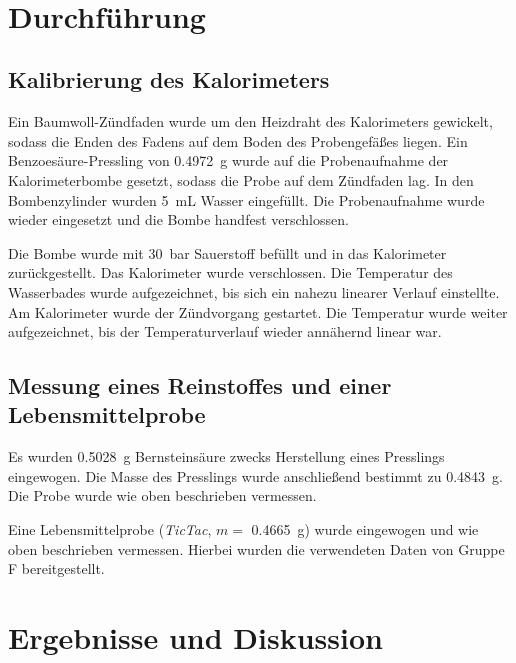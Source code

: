 \hfill
{} \\

\section{Durchführung}
\subsection{Kalibrierung des Kalorimeters}
Ein Baumwoll-Zündfaden wurde um den Heizdraht des Kalorimeters gewickelt, sodass die Enden des Fadens auf dem Boden des Probengefäßes liegen.
Ein Benzoesäure-Pressling von \qty{0.4972}{\gram} wurde auf die Probenaufnahme der Kalorimeterbombe gesetzt, sodass die Probe auf dem Zündfaden lag.
In den Bombenzylinder wurden \qty{5}{\milli\liter} Wasser eingefüllt.
Die Probenaufnahme wurde wieder eingesetzt und die Bombe handfest verschlossen.

Die Bombe wurde mit \qty{30}{\bar} Sauerstoff befüllt und in das Kalorimeter zurückgestellt.
Das Kalorimeter wurde verschlossen.
Die Temperatur des Wasserbades wurde aufgezeichnet, bis sich ein nahezu linearer Verlauf einstellte.
Am Kalorimeter wurde der Zündvorgang gestartet.
Die Temperatur wurde weiter aufgezeichnet, bis der Temperaturverlauf wieder annähernd linear war.

\subsection{Messung eines Reinstoffes und einer Lebensmittelprobe}
Es wurden \qty{0.5028}{\gram} Bernsteinsäure zwecks Herstellung eines Presslings eingewogen.
Die Masse des Presslings wurde anschließend bestimmt zu \qty{0.4843}{\gram}.
Die Probe wurde wie oben beschrieben vermessen.

Eine Lebensmittelprobe (\textit{TicTac}, $m =$ \qty{0.4665}{\gram}) wurde eingewogen und wie oben beschrieben vermessen.
Hierbei wurden die verwendeten Daten von Gruppe F bereitgestellt.

\section{Ergebnisse und Diskussion}

